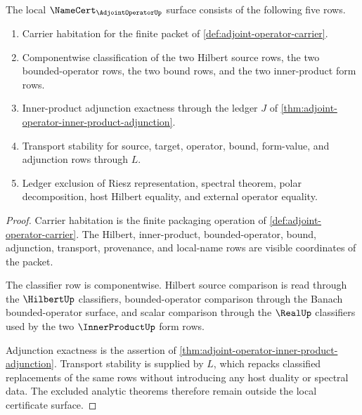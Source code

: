\begin{theorem}
\label{thm:adjoint-operator-namecert-obligations}
The local $\NameCert_{\AdjointOperatorUp}$ surface consists of the following five rows.
\begin{enumerate}
  \item Carrier habitation for the finite packet of \autoref{def:adjoint-operator-carrier}.
  \item Componentwise classification of the two Hilbert source rows, the two bounded-operator rows, the two bound rows, and the two inner-product form rows.
  \item Inner-product adjunction exactness through the ledger $J$ of \autoref{thm:adjoint-operator-inner-product-adjunction}.
  \item Transport stability for source, target, operator, bound, form-value, and adjunction rows through $L$.
  \item Ledger exclusion of Riesz representation, spectral theorem, polar decomposition, host Hilbert equality, and external operator equality.
\end{enumerate}
\end{theorem}
\begin{proof}
Carrier habitation is the finite packaging operation of \autoref{def:adjoint-operator-carrier}. The Hilbert, inner-product, bounded-operator, bound, adjunction, transport, provenance, and local-name rows are visible coordinates of the packet.

The classifier row is componentwise. Hilbert source comparison is read through the $\HilbertUp$ classifiers, bounded-operator comparison through the Banach bounded-operator surface, and scalar comparison through the $\RealUp$ classifiers used by the two $\InnerProductUp$ form rows.

Adjunction exactness is the assertion of \autoref{thm:adjoint-operator-inner-product-adjunction}. Transport stability is supplied by $L$, which repacks classified replacements of the same rows without introducing any host duality or spectral data. The excluded analytic theorems therefore remain outside the local certificate surface.
\end{proof}


